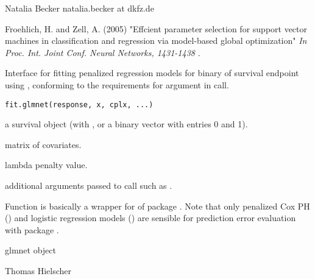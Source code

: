 \documentclass[letterpaper]{book}
\begin{document}
%
\begin{Author}\relax
 Natalia Becker natalia.becker at dkfz.de 
\end{Author}
%
\begin{References}\relax
Froehlich, H. and Zell, A. (2005) "Effcient parameter selection for support vector
machines in classification and regression via model-based global optimization"
\emph{In Proc. Int. Joint Conf. Neural Networks,  1431-1438 }.
\end{References}
%
\begin{Description}\relax
Interface for fitting penalized regression models for binary of survival endpoint using , conforming to the requirements for argument  in  call. 
\end{Description}
%
\begin{Usage}
\begin{verbatim}
fit.glmnet(response, x, cplx, ...)
\end{verbatim}
\end{Usage}
%
\begin{Arguments}
\begin{ldescription}
\item[\code{response}] a survival object (with , or a binary vector with entries 0 and 1).
\item[\code{x}]  matrix of covariates.
\item[\code{cplx}] lambda penalty value.
\item[\code{...}] additional arguments passed to  call such as .
\end{ldescription}
\end{Arguments}
%
\begin{Details}\relax
Function is basically a wrapper for  of package .
Note that only penalized Cox PH () and logistic regression models () are sensible for prediction error
evaluation with package .
\end{Details}
%
\begin{Value}
glmnet object
\end{Value}
%
\begin{Author}\relax
Thomas Hielscher \bsl{}
\end{Author}
\end{document}
